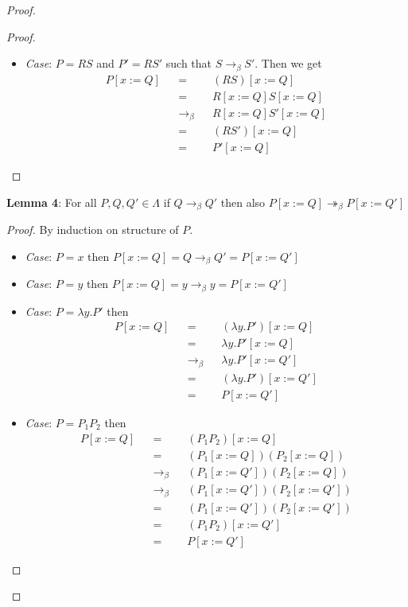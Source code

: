 \documentclass[12pt]{article}
\begin{document}
\begin{proof}
\begin{proof}
\begin{itemize}
\item \textsl{Case}: $P = R S$ and $P' = R S'$ such that $S \rightarrow_\beta S'$. Then we get
\begin{align*}
    P[x:=Q] &&=&& (R S)[x:=Q] \\
    &&=&& R[x:=Q] S[x:=Q] \\
    &&\rightarrow_\beta&& R[x:=Q] S'[x:=Q] \\
    &&=&& (R S')[x:=Q] \\
    &&=&& P'[x:=Q]
\end{align*}
\end{itemize}
\end{proof}

\textbf{Lemma 4}: For all $P,Q,Q' \in \Lambda$ if $Q \rightarrow_{\beta} Q'$ then also $P[x:=Q] \twoheadrightarrow_{\beta} P[x:=Q']$
\begin{proof}
By induction on structure of $P$.

\begin{itemize}
\item \textsl{Case}: $P=x$ then $P[x:=Q] = Q \rightarrow_{\beta} Q' = P[x:=Q']$ \\
\item \textsl{Case}: $P=y$ then $P[x:=Q] = y \rightarrow_{\beta} y = P[x:=Q']$ \\
\item \textsl{Case}: $P=\lambda y.P'$ then
\begin{align*}
    P[x:=Q] &&=&& (\lambda y.P')[x:=Q] \\
    &&=&& \lambda y.P'[x:=Q] \\
    &&\rightarrow_{\beta}&&  \lambda y.P'[x:=Q'] \\
    &&=&& (\lambda y.P')[x:=Q'] \\
    &&=&& P[x:=Q']
\end{align*}
\item \textsl{Case}: $P = P_1 P_2$ then
\begin{align*}
    P[x:=Q] &&=&& (P_1 P_2)[x:=Q] \\
    &&=&&  (P_1[x:=Q])(P_2[x:=Q]) \\
    &&\rightarrow_{\beta}&& (P_1[x:=Q'])(P_2[x:=Q]) \\
    &&\rightarrow_{\beta}&& (P_1[x:=Q'])(P_2[x:=Q']) \\
    &&=&&  (P_1[x:=Q'])(P_2[x:=Q']) \\
    &&=&& (P_1 P_2)[x:=Q'] \\
    &&=&& P[x:=Q']
\end{align*}
\end{itemize}
\end{proof}


\end{proof}
\end{document}
